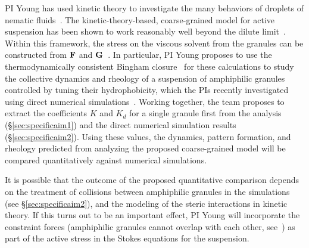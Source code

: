 PI Young has used kinetic theory to investigate the many behaviors
of droplets of nematic fluids~\cite{YoungShelleyStein2021_MBE}. The
kinetic-theory-based, coarse-grained model for active suspension has been
shown to work reasonably well beyond the dilute
limit~\cite{Saintillan2018_ARFM}. Within this framework, the stress on
the viscous solvent from the granules can be constructed from ${\bf F}$
and ${\bf G}$~\cite{TraversoMichellin2020_PRF,
TraversoMichellin2022_JFM}. In particular, PI Young proposes to use the
thermodynamically consistent Bingham
closure~\cite{YoungShelleyStein2021_MBE} for these calculations to study
the collective dynamics and rheology of a suspension of amphiphilic
granules controlled by tuning their hydrophobicity, which the PIs
recently investigated using direct numerical
simulations~\cite{fu-ryh-qua-you2022}. Working together, the team
proposes to extract the coefficients $K$ and $K_d$ for a single granule
first from the analysis (\S\ref{sec:specificaim1}) and the direct
numerical simulation results (\S\ref{sec:specificaim2}). Using these
values, the dynamics, pattern formation, and rheology predicted from
analyzing the proposed coarse-grained model will be compared
quantitatively against numerical simulations. 

It is possible that the outcome of the proposed quantitative comparison
depends on the treatment of collisions between amphiphilic granules in
the simulations (see \S\ref{sec:specificaim2}), and the modeling of the
steric interactions in kinetic theory. If this turns out to be an
important effect, PI Young will incorporate the
constraint forces (amphiphilic granules cannot overlap with each other,
see~\cite{Weady2022_PRF}) as part of the active stress in the Stokes
equations for the suspension. 

